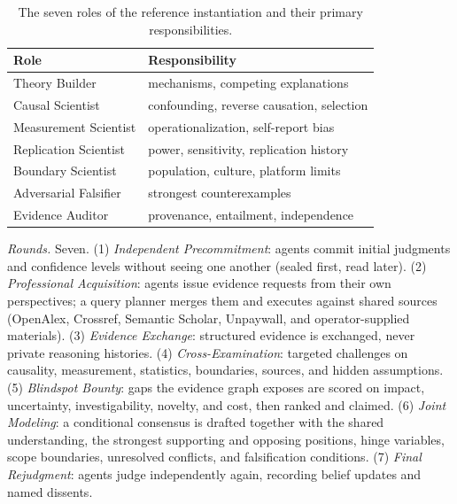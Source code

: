 \begin{table}[t]
\centering
\footnotesize
\setlength{\tabcolsep}{3pt}
\begin{tabular}{@{}l p{3.5cm}@{}}
\toprule
\textbf{Role} & \textbf{Responsibility} \\
\midrule
Theory Builder & mechanisms, competing explanations \\
Causal Scientist & confounding, reverse causation, selection \\
Measurement Scientist & operationalization, self-report bias \\
Replication Scientist & power, sensitivity, replication history \\
Boundary Scientist & population, culture, platform limits \\
Adversarial Falsifier & strongest counterexamples \\
Evidence Auditor & provenance, entailment, independence \\
\bottomrule
\end{tabular}
\caption{The seven roles of the reference instantiation and their primary
responsibilities.}
\label{tab:roles}
\end{table}

\emph{Rounds.} Seven.
(1) \emph{Independent Precommitment}: agents commit initial judgments and
confidence levels without seeing one another (sealed first, read later).
(2) \emph{Professional Acquisition}: agents issue evidence requests from their
own perspectives; a query planner merges them and executes against shared
sources (OpenAlex, Crossref, Semantic Scholar, Unpaywall, and operator-supplied
materials).
(3) \emph{Evidence Exchange}: structured evidence is exchanged, never private
reasoning histories.
(4) \emph{Cross-Examination}: targeted challenges on causality, measurement,
statistics, boundaries, sources, and hidden assumptions.
(5) \emph{Blindspot Bounty}: gaps the evidence graph exposes are scored on
impact, uncertainty, investigability, novelty, and cost, then ranked and
claimed.
(6) \emph{Joint Modeling}: a conditional consensus is drafted together with the
shared understanding, the strongest supporting and opposing positions, hinge
variables, scope boundaries, unresolved conflicts, and falsification
conditions.
(7) \emph{Final Rejudgment}: agents judge independently again, recording belief
updates and named dissents.

